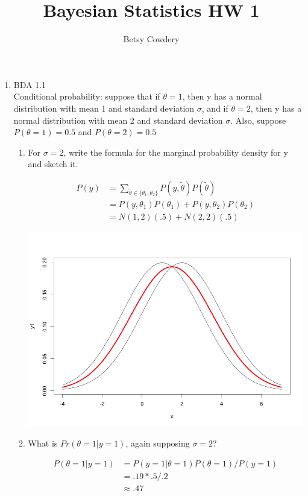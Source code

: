 \documentclass[11pt]{article}
\theoremstyle{definition}
\theoremstyle{remark}
\theoremstyle{definition}
\begin{document}
\author{Betsy Cowdery}
\title{Bayesian Statistics HW 1}
\date{}
\maketitle

\begin{enumerate}

\item BDA 1.1 \\ Conditional probability: suppose that if $\theta = 1$, then y has a normal distribution with mean 1 and standard deviation $\sigma$, and if $\theta = 2$, then y has a normal distribution with mean 2 and standard deviation $\sigma$. Also, suppose $P(\theta = 1) = 0.5$ and $P(\theta = 2) = 0.5$

\begin{enumerate}
\item For $\sigma = 2$, write the formula for the marginal probability density for y and sketch it.

\begin{align*}
	P(y) 
&= \sum_{\tilde{\theta} \in \{\theta_1, \theta_2\}} P(y,\tilde{\theta}) P(\tilde\theta)\\
&= P(y,\theta_1)P(\theta_1)+P(y,\theta_2)P(\theta_2)\\
&= N(1,2)(.5)+N(2,2)(.5)
\end{align*}

\includegraphics[scale=.4]{dist_1}


\item What is $Pr(\theta = 1|y = 1)$, again supposing $\sigma = 2$?

\begin{align*}
	P(\theta = 1|y = 1) 
	&= P(y=1|\theta=1)P(\theta=1)/P(y=1)\\
	&= .19*.5/.2 \\
	&\approx .47
\end{align*}
 


\end{enumerate}
\end{enumerate}
\end{document}
